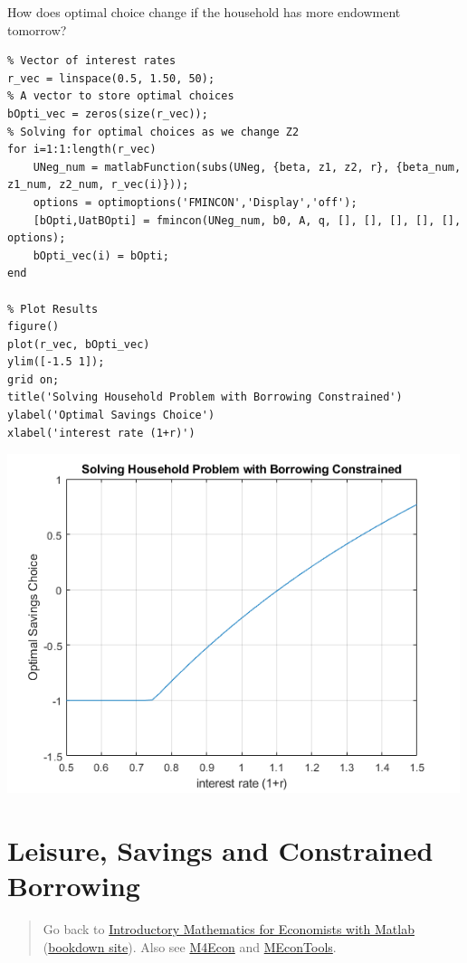 \documentclass[
]{book}
\begin{document}
How does optimal choice change if the household has more endowment
tomorrow?

\begin{verbatim}
% Vector of interest rates
r_vec = linspace(0.5, 1.50, 50);
% A vector to store optimal choices
bOpti_vec = zeros(size(r_vec));
% Solving for optimal choices as we change Z2
for i=1:1:length(r_vec)
    UNeg_num = matlabFunction(subs(UNeg, {beta, z1, z2, r}, {beta_num, z1_num, z2_num, r_vec(i)}));
    options = optimoptions('FMINCON','Display','off');
    [bOpti,UatBOpti] = fmincon(UNeg_num, b0, A, q, [], [], [], [], [], options);
    bOpti_vec(i) = bOpti;
end

% Plot Results
figure()
plot(r_vec, bOpti_vec)
ylim([-1.5 1]);
grid on;
title('Solving Household Problem with Borrowing Constrained')
ylabel('Optimal Savings Choice')
xlabel('interest rate (1+r)')
\end{verbatim}

\includegraphics[width=5.20833in,height=\textheight]{img/household_borrow_constrained_images/figure_1.png}

\hypertarget{leisure-savings-and-constrained-borrowing}{%
\section{Leisure, Savings and Constrained Borrowing}\label{leisure-savings-and-constrained-borrowing}}

\begin{quote}
Go back to \href{https://math4econ.github.io/}{Introductory Mathematics for Economists with Matlab} (\href{https://math4econ.github.io/bookdown}{bookdown site}). Also see \href{http://fanwangecon.github.io/M4Econ}{M4Econ} and \href{https://fanwangecon.github.io/MEconTools/}{MEconTools}.
\end{quote}
\end{document}
